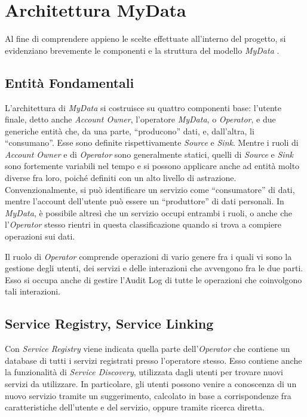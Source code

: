 \chapter{Architettura MyData}
\label{capitolo3}
\thispagestyle{empty}

\noindent Al fine di comprendere appieno le scelte effettuate all’interno del progetto, si evidenziano brevemente le componenti e la struttura del modello \textit{MyData} \cite{githubmydatastack}. 

\section{Entit\`a Fondamentali}
L’architettura di \textit{MyData} si costruisce su quattro componenti base: l’utente finale, detto anche \textit{Account Owner}, l’operatore \textit{MyData}, o \textit{Operator}, e due generiche entit\`a che, da una parte, “producono” dati, e, dall’altra, li “consumano”. Esse sono definite rispettivamente \textit{Source} e \textit{Sink}. Mentre i ruoli di \textit{Account Owner} e di \textit{Operator} sono generalmente statici, quelli di \textit{Source} e \textit{Sink} sono fortemente variabili nel tempo e si possono applicare anche ad entit\`a molto diverse fra loro, poich\'e definiti con un alto livello di astrazione. Convenzionalmente, si pu\`o identificare un servizio come “consumatore” di dati, mentre l’account dell’utente pu\`o essere un “produttore” di dati personali. In \textit{MyData}, \`e possibile altres\`i che un servizio occupi entrambi i ruoli, o anche che l’\textit{Operator} stesso rientri in questa classificazione quando si trova a compiere operazioni sui dati.

Il ruolo di \textit{Operator} comprende operazioni di vario genere fra i quali vi sono la gestione degli utenti, dei servizi e delle interazioni che avvengono fra le due parti. Esso si occupa anche di gestire l’Audit Log di tutte le operazioni che coinvolgono tali interazioni.

\section{Service Registry, Service Linking}
Con \textit{Service Registry} viene indicata quella parte dell’\textit{Operator} che contiene un database di tutti i servizi registrati presso l’operatore stesso. Esso contiene anche la funzionalit\`a di \textit{Service Discovery}, utilizzata dagli utenti per trovare nuovi servizi da utilizzare. In particolare, gli utenti possono venire a conoscenza di un nuovo servizio tramite un suggerimento, calcolato in base a corrispondenze fra caratteristiche dell’utente e del servizio, oppure tramite ricerca diretta.


